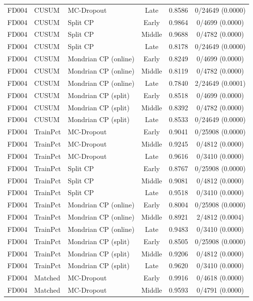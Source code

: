 \begin{table}[t]
\begin{tabular}{lllccc}
FD004 & CUSUM & MC-Dropout & Late & 0.8586 & 0/24649 (0.0000) \\
FD004 & CUSUM & Split CP & Early & 0.9864 & 0/4699 (0.0000) \\
FD004 & CUSUM & Split CP & Middle & 0.9688 & 0/4782 (0.0000) \\
FD004 & CUSUM & Split CP & Late & 0.8178 & 0/24649 (0.0000) \\
FD004 & CUSUM & Mondrian CP (online) & Early & 0.8249 & 0/4699 (0.0000) \\
FD004 & CUSUM & Mondrian CP (online) & Middle & 0.8119 & 0/4782 (0.0000) \\
FD004 & CUSUM & Mondrian CP (online) & Late & 0.7840 & 2/24649 (0.0001) \\
FD004 & CUSUM & Mondrian CP (split) & Early & 0.8518 & 0/4699 (0.0000) \\
FD004 & CUSUM & Mondrian CP (split) & Middle & 0.8392 & 0/4782 (0.0000) \\
FD004 & CUSUM & Mondrian CP (split) & Late & 0.8533 & 0/24649 (0.0000) \\
FD004 & TrainPct & MC-Dropout & Early & 0.9041 & 0/25908 (0.0000) \\
FD004 & TrainPct & MC-Dropout & Middle & 0.9245 & 0/4812 (0.0000) \\
FD004 & TrainPct & MC-Dropout & Late & 0.9616 & 0/3410 (0.0000) \\
FD004 & TrainPct & Split CP & Early & 0.8767 & 0/25908 (0.0000) \\
FD004 & TrainPct & Split CP & Middle & 0.9081 & 0/4812 (0.0000) \\
FD004 & TrainPct & Split CP & Late & 0.9518 & 0/3410 (0.0000) \\
FD004 & TrainPct & Mondrian CP (online) & Early & 0.8004 & 0/25908 (0.0000) \\
FD004 & TrainPct & Mondrian CP (online) & Middle & 0.8921 & 2/4812 (0.0004) \\
FD004 & TrainPct & Mondrian CP (online) & Late & 0.9483 & 0/3410 (0.0000) \\
FD004 & TrainPct & Mondrian CP (split) & Early & 0.8505 & 0/25908 (0.0000) \\
FD004 & TrainPct & Mondrian CP (split) & Middle & 0.9206 & 0/4812 (0.0000) \\
FD004 & TrainPct & Mondrian CP (split) & Late & 0.9620 & 0/3410 (0.0000) \\
FD004 & Matched & MC-Dropout & Early & 0.9916 & 0/4618 (0.0000) \\
FD004 & Matched & MC-Dropout & Middle & 0.9593 & 0/4791 (0.0000) \\

\end{tabular}
\end{table}
